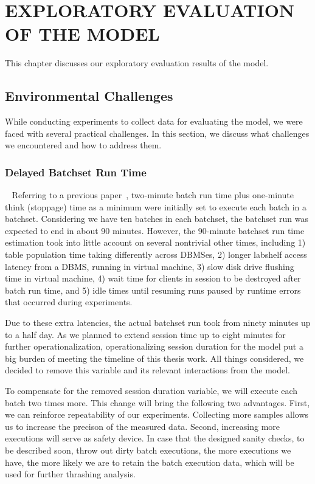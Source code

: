 \chapter{EXPLORATORY EVALUATION OF THE MODEL\label{chapter:explo_analysis}}

This chapter discusses our exploratory evaluation results of the model. 

\section{Environmental Challenges}\label{sec:challenges}

While conducting experiments to collect data for evaluating the model, 
we were faced with several practical challenges. 
In this section, we discuss what challenges we encountered and how to address them. 

\subsection{Delayed Batchset Run Time}~\label{sec:delayed_batchset_run_time}
Referring to a previous paper~\cite{Jung2013}, 
two-minute batch run time plus one-minute think (stoppage) time as a minimum 
were initially set to execute each batch in a batchset.
Considering we have ten batches in each batchset, 
the batchset run was expected to end in about 90 minutes. 
However, the 90-minute batchset run time estimation took into little account on
several nontrivial other times, including 
%
1) table population time taking differently across \hbox{DBMSes}, 
%
2) longer labshelf access latency from a \hbox{DBMS}, running in virtual machine, 
%
3) slow disk drive flushing time in virtual machine, 
%
4) wait time for clients in session to be destroyed after batch run time, and 
%
5) idle times until resuming runs paused by runtime errors that occurred during experiments.

Due to these extra latencies, the actual batchset run took from ninety minutes up to a half day. 
As we planned to extend session time up to eight minutes for further operationalization, 
operationalizing session duration for the model put a big burden of meeting the timeline of this thesis work.
All things considered, we decided to remove this variable and its relevant interactions from the model.

To compensate for the removed session duration variable, 
we will execute each batch two times more. 
This change will bring the following two advantages. 
First, we can reinforce repeatability of our experiments. 
Collecting more samples allows us to increase the precison of the measured data.
Second, increasing more executions will serve as safety device. 
In case that the designed sanity checks, to be described soon, throw out dirty batch executions, 
the more executions we have, the more likely we are to retain the batch execution data, which will be used for further thrashing analysis.

